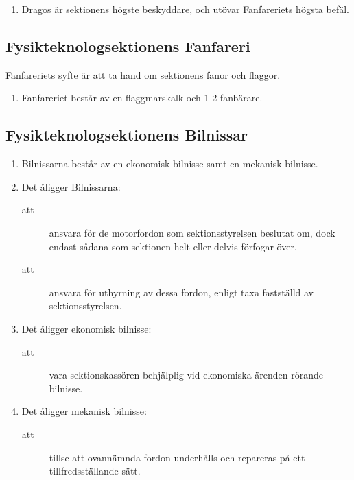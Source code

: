 \documentclass[11pt,a4paper]{article}
\begin{document}
\begin{enumerate}[\thesubsection .1]
  \item Dragos är sektionens högste beskyddare, och utövar Fanfareriets hög\-sta befäl.
\end{enumerate}


\subsection{Fysikteknologsektionens Fanfareri}
Fanfareriets syfte är att ta hand om sektionens fanor och flaggor.
\begin{enumerate}[\thesubsection .1]

  \item Fanfareriet består av en flaggmarskalk och 1-2 fanbärare.


\end{enumerate}

\subsection{Fysikteknologsektionens Bilnissar}

\begin{enumerate}[\thesubsection .1]

  \item Bilnissarna består av en ekonomisk bilnisse samt en mekanisk
  bilnisse.

  \item Det åligger Bilnissarna:
    \begin{description}
      \item[att] ansvara för de motorfordon som sektionsstyrelsen
      beslutat om, dock endast sådana som sektionen helt eller delvis
      förfogar över.
      \item[att] ansvara för uthyrning av dessa fordon, enligt taxa
      fastställd av sektionsstyrelsen.
    \end{description}

  \item Det åligger ekonomisk bilnisse:
    \begin{description}
      \item[att] vara sektionskassören behjälplig vid ekonomiska
      ärenden rör\-an\-de bilnisse.
    \end{description}

  \item Det åligger mekanisk bilnisse:
    \begin{description}
      \item[att] tillse att ovannämnda fordon underhålls och repareras
      på ett tillfredsställande sätt.
    \end{description}

\end{enumerate}
\end{document}
